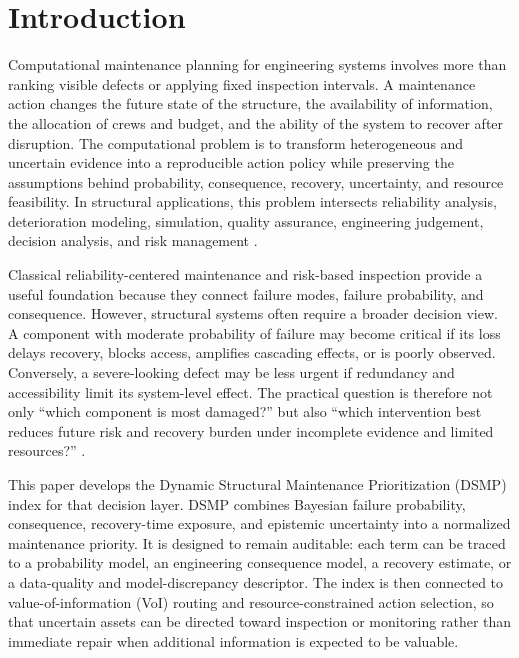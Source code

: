 \documentclass[cmes,article,submit,moreauthors,pdftex]{Definitions/tsp}
\begin{document}
\section{Introduction}

Computational maintenance planning for engineering systems involves more than ranking visible defects or applying fixed inspection intervals. A maintenance action changes the future state of the structure, the availability of information, the allocation of crews and budget, and the ability of the system to recover after disruption. The computational problem is to transform heterogeneous and uncertain evidence into a reproducible action policy while preserving the assumptions behind probability, consequence, recovery, uncertainty, and resource feasibility. In structural applications, this problem intersects reliability analysis, deterioration modeling, simulation, quality assurance, engineering judgement, decision analysis, and risk management \cite{rackwitz2001,frangopol2004,derkiureghian2009}.

Classical reliability-centered maintenance and risk-based inspection provide a useful foundation because they connect failure modes, failure probability, and consequence. However, structural systems often require a broader decision view. A component with moderate probability of failure may become critical if its loss delays recovery, blocks access, amplifies cascading effects, or is poorly observed. Conversely, a severe-looking defect may be less urgent if redundancy and accessibility limit its system-level effect. The practical question is therefore not only ``which component is most damaged?'' but also ``which intervention best reduces future risk and recovery burden under incomplete evidence and limited resources?'' \cite{bruneau2003,cimellaro2010,thons2018}.

This paper develops the Dynamic Structural Maintenance Prioritization (DSMP) index for that decision layer. DSMP combines Bayesian failure probability, consequence, recovery-time exposure, and epistemic uncertainty into a normalized maintenance priority. It is designed to remain auditable: each term can be traced to a probability model, an engineering consequence model, a recovery estimate, or a data-quality and model-discrepancy descriptor. The index is then connected to value-of-information (VoI) routing and resource-constrained action selection, so that uncertain assets can be directed toward inspection or monitoring rather than immediate repair when additional information is expected to be valuable.
\end{document}
